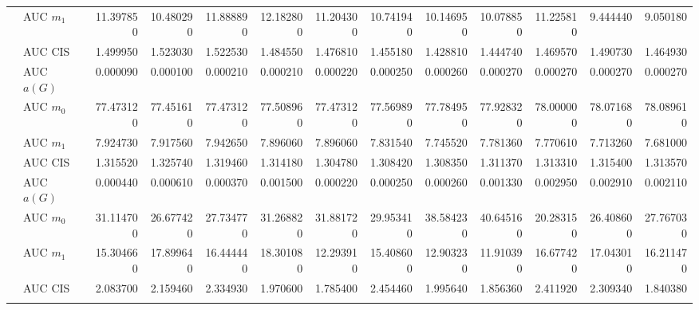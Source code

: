 \begin{table}[htbp]
\begin{tabular}{llrrrrrrrrrrr}
    & AUC $m_1$ & 11.397850 & 10.480290 & 11.888890 & 12.182800 & 11.204300 & 10.741940 & 10.146950 & 10.078850 & 11.225810 & 9.444440 & 9.050180 \\
    & AUC CIS & 1.499950 & 1.523030 & 1.522530 & 1.484550 & 1.476810 & 1.455180 & 1.428810 & 1.444740 & 1.469570 & 1.490730 & 1.464930 \\
    \addlinespace
    \multirow{4}{*}{degree} & AUC $a(G)$ & 0.000090 & 0.000100 & 0.000210 & 0.000210 & 0.000220 & 0.000250 & 0.000260 & 0.000270 & 0.000270 & 0.000270 & 0.000270 \\
    & AUC $m_0$ & 77.473120 & 77.451610 & 77.473120 & 77.508960 & 77.473120 & 77.569890 & 77.784950 & 77.928320 & 78.000000 & 78.071680 & 78.089610 \\
    & AUC $m_1$ & 7.924730 & 7.917560 & 7.942650 & 7.896060 & 7.896060 & 7.831540 & 7.745520 & 7.781360 & 7.770610 & 7.713260 & 7.681000 \\
    & AUC CIS & 1.315520 & 1.325740 & 1.319460 & 1.314180 & 1.304780 & 1.308420 & 1.308350 & 1.311370 & 1.313310 & 1.315400 & 1.313570 \\
    \addlinespace
    \multirow{4}{*}{random} & AUC $a(G)$ & 0.000440 & 0.000610 & 0.000370 & 0.001500 & 0.000220 & 0.000250 & 0.000260 & 0.001330 & 0.002950 & 0.002910 & 0.002110 \\
    & AUC $m_0$ & 31.114700 & 26.677420 & 27.734770 & 31.268820 & 31.881720 & 29.953410 & 38.584230 & 40.645160 & 20.283150 & 26.408600 & 27.767030 \\
    & AUC $m_1$ & 15.304660 & 17.899640 & 16.444440 & 18.301080 & 12.293910 & 15.408600 & 12.903230 & 11.910390 & 16.677420 & 17.043010 & 16.211470 \\
    & AUC CIS & 2.083700 & 2.159460 & 2.334930 & 1.970600 & 1.785400 & 2.454460 & 1.995640 & 1.856360 & 2.411920 & 2.309340 & 1.840380 \\
    \addlinespace
    \bottomrule
  \end{tabular}
\end{table}

